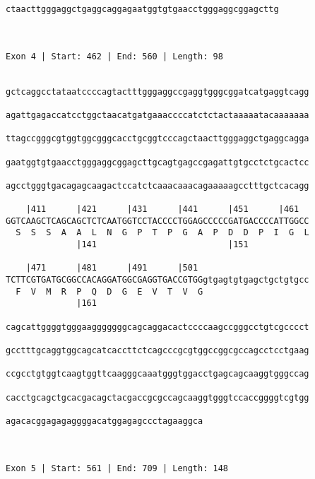 \documentclass{article}
\begin{document}
\begin{Verbatim}
ctaacttgggaggctgaggcaggagaatggtgtgaacctgggaggcggagcttg
                                                      
                                                      
 
Exon 4 | Start: 462 | End: 560 | Length: 98


gctcaggcctataatccccagtactttgggaggccgaggtgggcggatcatgaggtcagg
                                                            
agattgagaccatcctggctaacatgatgaaaccccatctctactaaaaatacaaaaaaa
                                                            
ttagccgggcgtggtggcgggcacctgcggtcccagctaacttgggaggctgaggcagga
                                                            
gaatggtgtgaacctgggaggcggagcttgcagtgagccgagattgtgcctctgcactcc
                                                            
agcctgggtgacagagcaagactccatctcaaacaaacagaaaaagcctttgctcacagg
                                                            
    |411      |421      |431      |441      |451      |461  
GGTCAAGCTCAGCAGCTCTCAATGGTCCTACCCCTGGAGCCCCCGATGACCCCATTGGCC
  S  S  S  A  A  L  N  G  P  T  P  G  A  P  D  D  P  I  G  L
              |141                          |151            
  
    |471      |481      |491      |501                      
TCTTCGTGATGCGGCCACAGGATGGCGAGGTGACCGTGGgtgagtgtgagctgctgtgcc
  F  V  M  R  P  Q  D  G  E  V  T  V  G                     
              |161                                          
  
cagcattggggtgggaagggggggcagcaggacactccccaagccgggcctgtcgcccct
                                                            
gcctttgcaggtggcagcatcaccttctcagcccgcgtggccggcgccagcctcctgaag
                                                            
ccgcctgtggtcaagtggttcaagggcaaatgggtggacctgagcagcaaggtgggccag
                                                            
cacctgcagctgcacgacagctacgaccgcgccagcaaggtgggtccaccggggtcgtgg
                                                            
agacacggagagaggggacatggagagccctagaaggca
                                       
                                       
 
Exon 5 | Start: 561 | End: 709 | Length: 148



\end{Verbatim}
\end{document}
